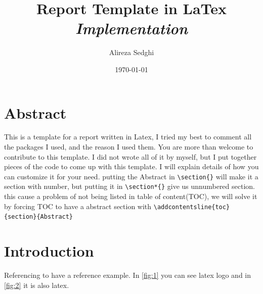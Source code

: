 \documentclass[12pt]{article}
\title{Report Template in LaTex\\\vspace{10pt} \small\textit{Implementation}\vspace{0.5ex}}
\author{Alireza Sedghi}
\date{\small{\today}}
\newcommand{\code}[1]{\texttt{#1}}
\begin{document}
\maketitle
\thispagestyle{empty} 

\newpage
\tableofcontents
\thispagestyle{empty}

\newpage
\listoffigures
\listoftables
{}

\newpage
{}

\section*{Abstract}
\thispagestyle{plain} %

This is a template for a report written in Latex, I tried my best to comment all the packages I used, and the reason I used them. You are more than welcome to contribute to this template. I did not wrote all of it by myself, but I put together pieces of the code to come up with this template. I will explain details of how you can customize it for your need. putting the Abstract in \code{\textbackslash section\{\}} will make it a section with number, but putting it in \code{\textbackslash section*\{\}} give us unnumbered section. this cause a problem of not being listed in table of content(TOC), we will solve it by forcing TOC to have a abstract section with \code{\textbackslash addcontentsline\{toc\}\{section\}\{Abstract\}}



\newpage
\section{Introduction}

\lipsum[3]Referencing \cite{ref1} to have a reference example. \lipsum[3]\lipsum[1] In \autoref{fig:1} you can see latex logo and in \autoref{fig:2} it is also latex.
\lipsum[2-4]
\end{document}
